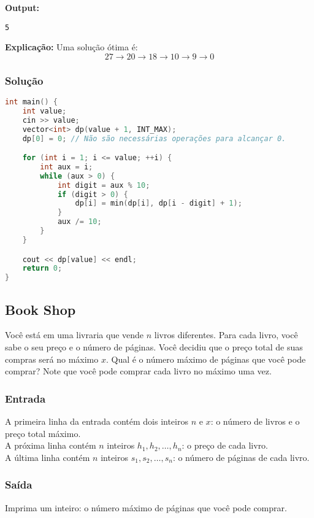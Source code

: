 \textbf{Output:}
\begin{verbatim}
5
\end{verbatim}

\textbf{Explicação:} Uma solução ótima é: 
\[
27 \rightarrow 20 \rightarrow 18 \rightarrow 10 \rightarrow 9 \rightarrow 0
\]

\subsubsection*{Solução}
\begin{lstlisting}[language=C++]
int main() {
    int value;
    cin >> value;
    vector<int> dp(value + 1, INT_MAX);
    dp[0] = 0; // Não são necessárias operações para alcançar 0.

    for (int i = 1; i <= value; ++i) {
        int aux = i;
        while (aux > 0) {
            int digit = aux % 10;
            if (digit > 0) {
                dp[i] = min(dp[i], dp[i - digit] + 1);
            }
            aux /= 10;
        }
    }

    cout << dp[value] << endl;
    return 0;
}
\end{lstlisting}

\subsection{Book Shop}
Você está em uma livraria que vende \( n \) livros diferentes. Para cada livro, você sabe o seu preço e o número de páginas. Você decidiu que o preço total de suas compras será no máximo \( x \). Qual é o número máximo de páginas que você pode comprar? Note que você pode comprar cada livro no máximo uma vez.

\subsubsection*{Entrada}
A primeira linha da entrada contém dois inteiros \( n \) e \( x \): o número de livros e o preço total máximo.\\  
A próxima linha contém \( n \) inteiros \( h_1, h_2, \dots, h_n \): o preço de cada livro.\\  
A última linha contém \( n \) inteiros \( s_1, s_2, \dots, s_n \): o número de páginas de cada livro.

\subsubsection*{Saída}
Imprima um inteiro: o número máximo de páginas que você pode comprar.

